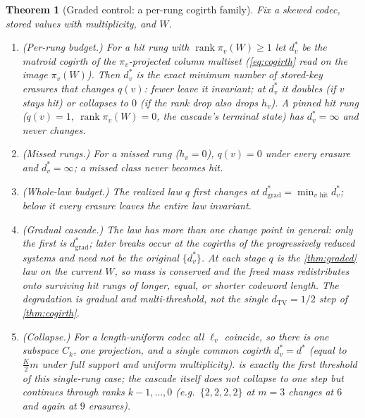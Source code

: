 \documentclass[11pt]{article}
\theoremstyle{definition}
\theoremstyle{plain}
\newtheorem{theorem}{Theorem}[section]
\theoremstyle{remark}
\newcommand{\TV}{d_{\mathrm{TV}}}
\DeclareMathOperator{\rank}{rank}
\newcommand{\W}{W}                          %
\newcommand{\proj}{\pi}                     %
\begin{document}
\begin{theorem}[Graded control: a per-rung cogirth family]
\label{thm:cogirth-graded}
Fix a skewed codec, stored values with multiplicity, and $\W$.
\begin{enumerate}
  \item \emph{(Per-rung budget.)} For a \emph{hit} rung with $\rank \proj_v(\W) \ge 1$ let
  $d^\ast_v$ be the matroid cogirth of the $\proj_v$-projected column multiset
  (\eqref{eq:cogirth} read on the image $\proj_v(\W)$). Then $d^\ast_v$ is the exact minimum
  number of stored-key erasures that changes $q(v)$: fewer leave it invariant; at $d^\ast_v$ it
  doubles (if $v$ stays hit) or collapses to $0$ (if the rank drop also drops $h_v$). A
  \emph{pinned} hit rung ($q(v) = 1$, $\rank \proj_v(\W) = 0$, the cascade's terminal state)
  has $d^\ast_v = \infty$ and never changes.
  \item \emph{(Missed rungs.)} For a \emph{missed} rung ($h_v = 0$), $q(v) = 0$ under every
  erasure and $d^\ast_v = \infty$; a missed class never becomes hit.
  \item \emph{(Whole-law budget.)} The realized law $q$ first changes at
  $d^\ast_{\mathrm{grad}} = \min_{v \text{ hit}} d^\ast_v$; below it every erasure leaves the
  entire law invariant.
  \item \emph{(Gradual cascade.)} The law has more than one change point in general: only
  the first is $d^\ast_{\mathrm{grad}}$; later breaks occur at the cogirths of the
  progressively \emph{reduced} systems and need not be the original $\{d^\ast_v\}$. At each
  stage $q$ is the \cref{thm:graded} law on the current $\W$, so mass is conserved and the
  freed mass redistributes onto surviving hit rungs of longer, equal, or shorter codeword
  length. The degradation is gradual and multi-threshold, not the single $\TV = 1/2$ step of
  \cref{thm:cogirth}.
  \item \emph{(Collapse.)} For a length-uniform codec all $\ell_v$ coincide, so there is one
  subspace $C_k$, one projection, and a single common cogirth $d^\ast_v = d^\ast$ (equal to
  $\tfrac{K}{2}m$ under full support and uniform multiplicity).  is exactly
  the \emph{first} threshold of this single-rung case; the cascade itself does not collapse to
  one step but continues through ranks $k{-}1,\dots,0$ (e.g.\ $\{2,2,2,2\}$ at $m=3$ changes at
  $6$ and again at $9$ erasures).
\end{enumerate}
\end{theorem}
\end{document}
